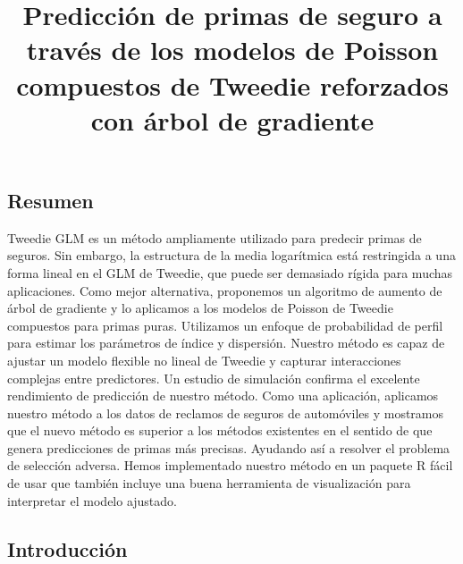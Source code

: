 \documentclass[]{article}
\title{Predicción de primas de seguro a través de los modelos de Poisson
compuestos de Tweedie reforzados con árbol de gradiente}
\author{}
\date{}
\begin{document}
\maketitle

\subsection{Resumen}\label{resumen}

Tweedie GLM es un método ampliamente utilizado para predecir primas de
seguros. Sin embargo, la estructura de la media logarítmica está
restringida a una forma lineal en el GLM de Tweedie, que puede ser
demasiado rígida para muchas aplicaciones. Como mejor alternativa,
proponemos un algoritmo de aumento de árbol de gradiente y lo aplicamos
a los modelos de Poisson de Tweedie compuestos para primas puras.
Utilizamos un enfoque de probabilidad de perfil para estimar los
parámetros de índice y dispersión. Nuestro método es capaz de ajustar un
modelo flexible no lineal de Tweedie y capturar interacciones complejas
entre predictores. Un estudio de simulación confirma el excelente
rendimiento de predicción de nuestro método. Como una aplicación,
aplicamos nuestro método a los datos de reclamos de seguros de
automóviles y mostramos que el nuevo método es superior a los métodos
existentes en el sentido de que genera predicciones de primas más
precisas. Ayudando así a resolver el problema de selección adversa.
Hemos implementado nuestro método en un paquete R fácil de usar que
también incluye una buena herramienta de visualización para interpretar
el modelo ajustado.

\subsection{Introducción}\label{introduccion}
\end{document}
